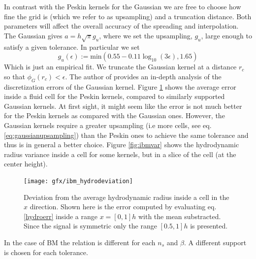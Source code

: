 \documentclass[ twoside,openright,titlepage,numbers=noenddot,%
headinclude,footinclude,cleardoublepage=empty,abstract=on,
BCOR=5mm,paper=a4,fontsize=11pt, dvipsnames
]{scrreprt}
\begin{document}
In contrast with the Peskin kernels for the Gaussian we are free to choose how fine the grid is (which we refer to as upsampling) and a truncation distance. Both parameters will affect the overall accuracy of the spreading and interpolation. The Gaussian gives $a=h \sqrt{\pi} g_u$, where we set the upsampling, $g_u$, large enough to satisfy a given tolerance. In particular we set
\begin{equation}
  \label{eq:gaussianupsampling}
  g_u(\epsilon) := \text{min}\left(0.55 -0.11 \log_{10}(3\epsilon), 1.65\right)
\end{equation}
Which is just an empirical fit.
We truncate the Gaussian kernel at a distance $r_c$ so that $\phi_G(r_c) < \epsilon$. The author of \cite{Keaveny2014} provides an in-depth analysis of the discretization errors of the Gaussian kernel.
Figure \ref{fig:ibm_hydrovar} shows the average error inside a fluid cell for the Peskin kernels, compared to similarly supported Gaussian kernels. At first sight, it might seem like the error is not much better for the Peskin kernels as compared with the Gaussian ones. However, the Gaussian kernels require a greater upsampling (i.e more cells, see eq. \eqref{eq:gaussianupsampling}) than the Peskin ones to achieve the same tolerance and thus is in general a better choice. Figure \ref{fig:ibmvar} shows the hydrodynamic radius variance inside a cell for some kernels, but in a slice of the cell (at the center height).
\begin{figure}[H]
\label{fig:ibm_hydrovar}
\texttt{[image: gfx/ibm\_hydrodeviation]}
  \caption{Deviation from the average hydrodynamic radius inside a cell in the $x$ direction. Shown here is the error computed by evaluating eq. \eqref{hydroerr} inside a range $x=[0, 1]h$ with the mean substracted. Since the signal is symmetric only the range $[0.5, 1]h$ is presented.}
\end{figure}
In the case of BM the relation is different for each $n_s$ and $\beta$. A different support is chosen for each tolerance. 
\end{document}
